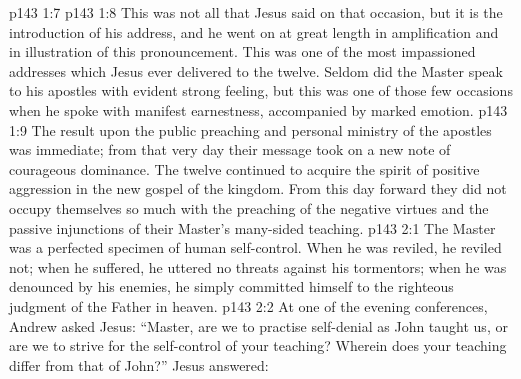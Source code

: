 \vs p143 1:7 
\vs p143 1:8 \pc This was not all that Jesus said on that occasion, but it is the introduction of his address, and he went on at great length in amplification and in illustration of this pronouncement. This was one of the most impassioned addresses which Jesus ever delivered to the twelve. Seldom did the Master speak to his apostles with evident strong feeling, but this was one of those few occasions when he spoke with manifest earnestness, accompanied by marked emotion.
\vs p143 1:9 \pc The result upon the public preaching and personal ministry of the apostles was immediate; from that very day their message took on a new note of courageous dominance. The twelve continued to acquire the spirit of positive aggression in the new gospel of the kingdom. From this day forward they did not occupy themselves so much with the preaching of the negative virtues and the passive injunctions of their Master’s many\hyp{}sided teaching.
\vs p143 2:1 The Master was a perfected specimen of human self\hyp{}control. When he was reviled, he reviled not; when he suffered, he uttered no threats against his tormentors; when he was denounced by his enemies, he simply committed himself to the righteous judgment of the Father in heaven.
\vs p143 2:2 \pc At one of the evening conferences, Andrew asked Jesus: “Master, are we to practise self\hyp{}denial as John taught us, or are we to strive for the self\hyp{}control of your teaching? Wherein does your teaching differ from that of John?” Jesus answered: 
